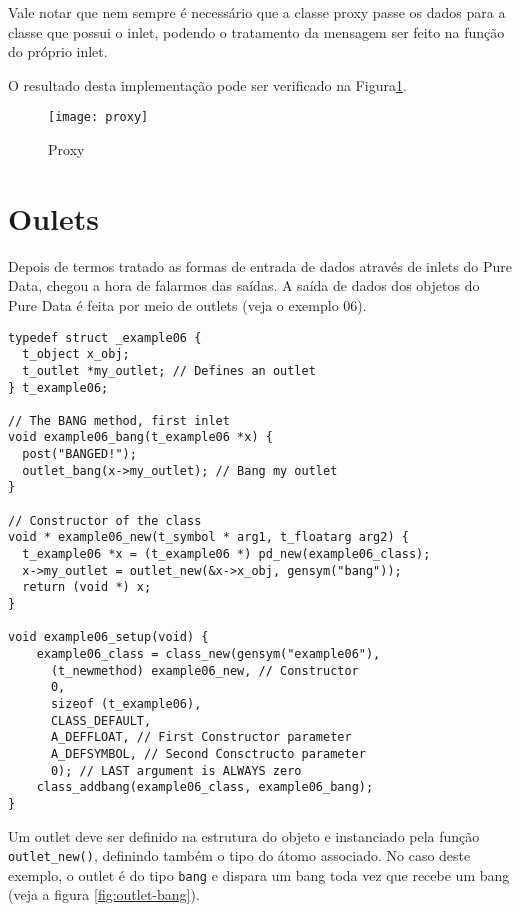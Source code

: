 Vale notar que nem sempre é necessário que a classe proxy passe os dados para a
classe que possui o inlet, podendo o tratamento da mensagem ser feito na função
do próprio inlet.

O resultado desta implementação pode ser verificado na Figura\ref{fig:proxy}.

\begin{figure}[h!]
\centering
\texttt{[image: proxy]}
\caption{Proxy}
\label{fig:proxy}
\end{figure}

\section{Oulets}

Depois de termos tratado as formas de entrada de dados através de inlets do
Pure Data, chegou a hora de falarmos das saídas. A saída de dados dos objetos
do Pure Data é feita por meio de outlets (veja o exemplo 06).

\begin{lstlisting}[caption=Exemplo de outlet]
typedef struct _example06 {
  t_object x_obj;
  t_outlet *my_outlet; // Defines an outlet
} t_example06;

// The BANG method, first inlet
void example06_bang(t_example06 *x) {
  post("BANGED!");
  outlet_bang(x->my_outlet); // Bang my outlet
}

// Constructor of the class
void * example06_new(t_symbol * arg1, t_floatarg arg2) {
  t_example06 *x = (t_example06 *) pd_new(example06_class);
  x->my_outlet = outlet_new(&x->x_obj, gensym("bang"));
  return (void *) x;
}

void example06_setup(void) {
    example06_class = class_new(gensym("example06"),
      (t_newmethod) example06_new, // Constructor
      0, 
      sizeof (t_example06),
      CLASS_DEFAULT,
      A_DEFFLOAT, // First Constructor parameter
      A_DEFSYMBOL, // Second Consctructo parameter
      0); // LAST argument is ALWAYS zero
    class_addbang(example06_class, example06_bang);
}
\end{lstlisting}

Um outlet deve ser definido na estrutura do objeto e instanciado pela função
\texttt{outlet\_new()}, definindo também o tipo do átomo associado.
No caso deste exemplo, o outlet é do tipo \texttt{bang} e dispara um bang toda
vez que recebe um bang (veja a figura \ref{fig:outlet-bang}).

